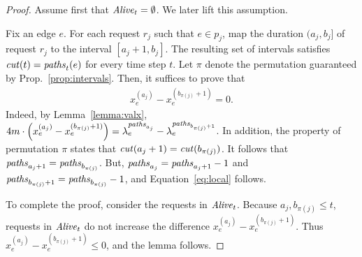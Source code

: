 \documentclass[11pt]{article}
\newenvironment{proof sketch}[1]{\noindent {\emph{Proof sketch of #1:}}}{\hfill \qed}
\newtheorem{lemma}{Lemma}
\newcommand{\plp}{\textsc{p-lp}}
\newcommand{\valp}{P}
\newcommand{\initt}{\text{\textsf{start}}}
\newcommand{\alive}{\text{\textit{Alive}}}
\newcommand{\cut}{\text{\textit{cut}}}
\newcommand{\paths}{\text{\textit{paths}}_t}
\newcommand{\pathtt}[1]{\text{\textit{paths}}_{#1}}
\begin{document}
\begin{proof}
Assume first that $\alive_t =\emptyset$. We later lift this
assumption.

Fix an edge $e$.  For each request $r_j$ such that $e\in p_j$, map the
duration $(a_j,b_j]$ of request $r_j$ to the interval $[a_j+1,b_j]$.
The resulting set of intervals satisfies $\cut(t)=\paths(e)$ for every time step $t$.  Let
$\pi$ denote the permutation guaranteed by Prop.~\ref{prop:intervals}.
Then, it suffices to prove that
\begin{align}\label{eq:local}
x_e^{(a_j)} - x_e^{(b_{\pi(j)}+1)} =0.
\end{align}
Indeed, by Lemma~\ref{lemma:valx},
$4m \cdot\left(x_e^{(a_j)} - x_e^{(b_{\pi(j)}+1)}\right) = \lambda_e^{\pathtt{a_j}}-\lambda_e^{\pathtt{b_{\pi(j)}+1}}$.
In addition, the property of permutation $\pi$ states that $\cut(a_j+1)=\cut(b_{\pi(j)})$.
It follows that $\pathtt{a_j+1}=\pathtt{b_{\pi(j)}}$.
But, $\pathtt{a_j} =\pathtt{a_j+1}-1$ and
$\pathtt{b_{\pi(j)}+1} = \pathtt{b_{\pi(j)}}-1$, and Equation~\ref{eq:local} follows.

To complete the proof, consider the requests in $\alive_t$.
Because $a_j, b_{\pi(j)}\leq t$, requests in $\alive_t$ do not increase the difference $x_e^{(a_j)} - x_e^{(b_{\pi(j)}+1)}$. Thus
$x_e^{(a_j)} - x_e^{(b_{\pi(j)}+1)}\leq 0$, and the lemma follows.
\end{proof}


\begin{comment}
  The proof of the following lemma is similar to the proof of first part of Lemma~2.3 in~\cite{BN06}.
\begin{lemma}\label{lemma:aplha 1}
  Assume that:
  \begin{enumerate}[(i)]
    \item The variables $\{x_e^{(j-1)}\}_{e \in E} \cup \{z_\ell\}_{\ell \in \alive_{j-1}}$ constitute a feasible solution for $\plp(j-1)$
    \item For every $j\in \mathbb{N}^+$, there is a feasible routing for every $r_\ell$, where $\ell \in \alive_j$.
  \end{enumerate}
  Then, for upon arrival of a routing request $r_j=(s_j,d_j)$ it holds: $$\sum_{e\in p_j}\frac{x_{e}^{(j-1)}}{c_e} < 1\:.$$
\end{lemma}
\begin{proof}
    The proof is by contradiction.
    Let us assume that there is a request $r_j=\initt_i(s_j,d_j)$ such that $\sum_{e\in p_j}\frac{x_{e}^{(j-1)}}{c_e} \geq j$.
    It follows that the covering constraint of $\plp(j)$ is satisfied before routing $r_j$, and thus before updating the primal variables.
    Hence, $\{x_e^{(j)}\}_{e \in E} \cup \{z_\ell\}_{\ell \in \alive_{j}}$ constitute a feasible solution for $\plp(j)$, as well.
    Lemma~\ref{eqn:alive} and the definition of the set $\alive_j$ imply that before routing $r_j$ the following holds:
    \[
        \valp_{j-1}(x,z) < \frac {1}{4} + |\alive_{i-1}| = \frac {1}{2} + (|\alive_i| -1) <  |\alive_i|\:,
    \]
    which contradicts the second assumption, i.e., contradicting weak duality.
\end{proof}
\end{comment}
\end{document}
